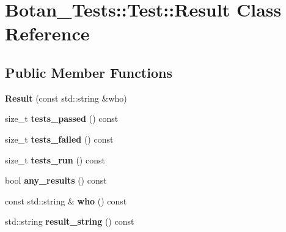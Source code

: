 \hypertarget{class_botan___tests_1_1_test_1_1_result}{}\section{Botan\+\_\+\+Tests\+:\+:Test\+:\+:Result Class Reference}
\label{class_botan___tests_1_1_test_1_1_result}
\subsection*{Public Member Functions}
\begin{DoxyCompactItemize}
\item 
\mbox{\label{class_botan___tests_1_1_test_1_1_result_a173a2db0c1d7df641bc4647a4172d269}} 
{\bfseries Result} (const std\+::string \&who)
\item 
\mbox{\label{class_botan___tests_1_1_test_1_1_result_a4ae8e4cc2053735257a896bcea6cb0db}} 
size\+\_\+t {\bfseries tests\+\_\+passed} () const
\item 
\mbox{\label{class_botan___tests_1_1_test_1_1_result_a26e63ced02a2435ccc77b03ae6ae7975}} 
size\+\_\+t {\bfseries tests\+\_\+failed} () const
\item 
\mbox{\label{class_botan___tests_1_1_test_1_1_result_a8ab7148eee896a73d3418f7091931d4a}} 
size\+\_\+t {\bfseries tests\+\_\+run} () const
\item 
\mbox{\label{class_botan___tests_1_1_test_1_1_result_ab40e641777cfbb6c46de53df3e7ee324}} 
bool {\bfseries any\+\_\+results} () const
\item 
\mbox{\label{class_botan___tests_1_1_test_1_1_result_a62f2189ca918902c12f7d2fc37dd6f6d}} 
const std\+::string \& {\bfseries who} () const
\item 
\mbox{\label{class_botan___tests_1_1_test_1_1_result_af2362213853c8d8fd90f1a3e6b97bcaa}} 
std\+::string {\bfseries result\+\_\+string} () const
\item 

\end{DoxyCompactItemize}
